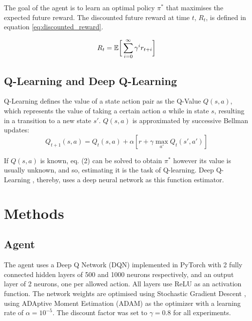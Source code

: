 \documentclass{article}
\begin{document}
The goal of the agent is to learn an optimal policy $\pi^*$ that maximises the expected future reward. The discounted future reward at time $t$, $R_t$, is defined in equation \eqref{eq:discounted_reward}.

\begin{equation}
R_t = \mathbb{E} \bigg{[} \sum^{\infty}_{i=0} \gamma^i r_{t+i} \bigg{]} 
\label{eq:discounted_reward}     
\end{equation}

\subsection{Q-Learning and Deep Q-Learning}
Q-Learning \cite{watkins} defines the value of a state action pair as the Q-Value $Q(s,a)$, which represents the value of taking a certain action $a$ while in state $s$, resulting in a transition to a new state $s'$.
$Q(s,a)$ is approximated by successive Bellman updates:
\begin{equation}
    Q_{t+1}(s,a) = Q_t(s,a) + \alpha [r + \gamma \max_{a'}Q_t(s',a')]
\label{eq:bellman}
\end{equation}

If $Q(s,a)$ is known, eq. (2) can be solved to obtain $\pi^*$ however its value is usually unknown, and so, estimating it is the task of Q-learning. Deep Q-Learning \cite{mnih2015}, thereby, uses a deep neural network as this function estimator.

\section{Methods} \label{methods}
\subsection{Agent}
The agent uses a Deep Q Network (DQN) implemented in PyTorch \cite{pytorch} with 2 fully connected hidden layers of 500 and 1000 neurons respectively, and an output layer of 2 neurons, one per allowed action.
All layers use ReLU as an activation function. The network weights are optimised using Stochastic Gradient Descent \cite{kiefer}, using ADAptive Moment Estimation (ADAM) \cite{adam} as the optimizer with a learning rate of $\alpha=10^{-5}$. The discount factor was set to $\gamma=0.8$ for all experiments.
\end{document}
